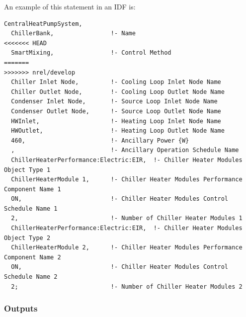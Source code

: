 An example of this statement in an IDF is:

\begin{lstlisting}
CentralHeatPumpSystem,
  ChillerBank,                !- Name
<<<<<<< HEAD
  SmartMixing,                !- Control Method
=======
>>>>>>> nrel/develop
  Chiller Inlet Node,         !- Cooling Loop Inlet Node Name
  Chiller Outlet Node,        !- Cooling Loop Outlet Node Name
  Condenser Inlet Node,       !- Source Loop Inlet Node Name
  Condenser Outlet Node,      !- Source Loop Outlet Node Name
  HWInlet,                    !- Heating Loop Inlet Node Name
  HWOutlet,                   !- Heating Loop Outlet Node Name
  460,                        !- Ancillary Power {W}
  ,                           !- Ancillary Operation Schedule Name
  ChillerHeaterPerformance:Electric:EIR,  !- Chiller Heater Modules Object Type 1
  ChillerHeaterModule 1,      !- Chiller Heater Modules Performance Component Name 1
  ON,                         !- Chiller Heater Modules Control Schedule Name 1
  2,                          !- Number of Chiller Heater Modules 1
  ChillerHeaterPerformance:Electric:EIR,  !- Chiller Heater Modules Object Type 2
  ChillerHeaterModule 2,      !- Chiller Heater Modules Performance Component Name 2
  ON,                         !- Chiller Heater Modules Control Schedule Name 2
  2;                          !- Number of Chiller Heater Modules 2
\end{lstlisting}

\subsubsection{Outputs}\label{outputs-17-000}

